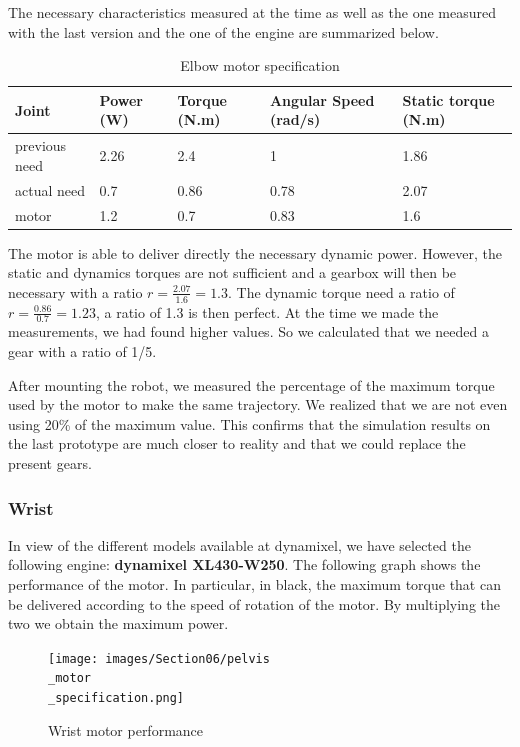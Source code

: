 \bigbreak
The necessary characteristics measured at the time as well as the one measured with the last version and the one of the engine are summarized below.
\begin{table}[ht]
    \centering
    \begin{tabular}{|p{1.5cm} | p{2cm} | p{2.5cm}| p{2.7cm} | p{2.7cm} |} 
        \hline
        \textbf{Joint}& \textbf{Power (W)} & \textbf{Torque (N.m)} & \textbf{Angular Speed (rad/s)} & \textbf{Static torque (N.m)}\\ [0.3ex]
        \hline
        previous need & 2.26 & 2.4 & 1 & 1.86 \\ 
        \hline
        actual need & 0.7 & 0.86 & 0.78 & 2.07 \\ 
        \hline
        motor & 1.2 & 0.7 & 0.83 & 1.6\\ 
        \hline
    \end{tabular}
    \caption{Elbow motor specification}
\end{table}
\FloatBarrier
The motor is able to deliver directly the necessary dynamic power. However, the static and dynamics torques are not sufficient and a gearbox will then be necessary with a ratio $r=\frac{2.07}{1.6}=1.3$. The dynamic torque need a ratio of $r=\frac{0.86}{0.7}=1.23$, a ratio of 1.3 is then perfect. At the time we made the measurements, we had found higher values. So we calculated that we needed a gear with a ratio of 1/5.

\bigbreak
After mounting the robot, we measured the percentage of the maximum torque used by the motor to make the same trajectory. We realized that we are not even using 20\% of the maximum value. This confirms that the simulation results on the last prototype are much closer to reality and that we could replace the present gears.

\subsubsection{Wrist}

In view of the different models available at dynamixel, we have selected the following engine: \textbf{dynamixel XL430-W250}. The following graph shows the performance of the motor. In particular, in black, the maximum torque that can be delivered according to the speed of rotation of the motor. By multiplying the two we obtain the maximum power.
\begin{figure}[ht]
    \centering
    \texttt{[image: images/Section06/pelvis\\\_motor\\\_specification.png]}
    \caption{Wrist motor performance}
    \label{fig:mesh15}
\end{figure}
\FloatBarrier

